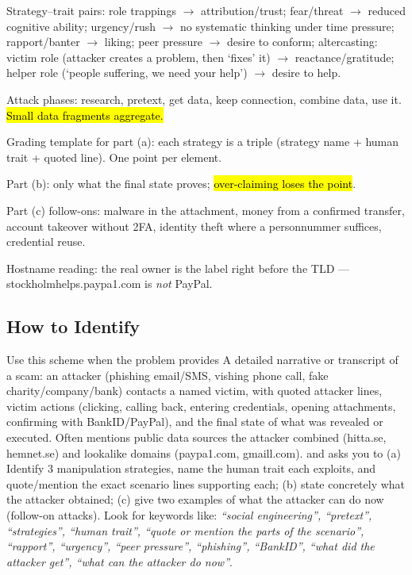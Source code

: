 \documentclass[12pt, a4paper]{article}
\newcommand{\imp}[1]{\hl{#1}}                       %
\begin{document}
\begin{theorybox}
\begin{tightitem}
    \item Strategy--trait pairs: role trappings $\rightarrow$ attribution/trust; fear/threat $\rightarrow$ reduced cognitive ability; urgency/rush $\rightarrow$ no systematic thinking under time pressure; rapport/banter $\rightarrow$ liking; peer pressure $\rightarrow$ desire to conform; altercasting: victim role (attacker creates a problem, then `fixes' it) $\rightarrow$ reactance/gratitude; helper role (`people suffering, we need your help') $\rightarrow$ desire to help.
    \item Attack phases: research, pretext, get data, keep connection, combine data, use it. \imp{Small data fragments aggregate.}
    \item Grading template for part (a): each strategy is a triple (strategy name + human trait + quoted line). One point per element.
    \item Part (b): only what the final state proves; \imp{over-claiming loses the point}.
    \item Part (c) follow-ons: malware in the attachment, money from a confirmed transfer, account takeover without 2FA, identity theft where a personnummer suffices, credential reuse.
    \item Hostname reading: the real owner is the label right before the TLD --- stockholmhelps.paypa1.com is \emph{not} PayPal.
\end{tightitem}
\end{theorybox}

\subsection*{How to Identify}
Use this scheme when the problem provides A detailed narrative or transcript of a scam: an attacker (phishing email/SMS, vishing phone call, fake charity/company/bank) contacts a named victim, with quoted attacker lines, victim actions (clicking, calling back, entering credentials, opening attachments, confirming with BankID/PayPal), and the final state of what was revealed or executed. Often mentions public data sources the attacker combined (hitta.se, hemnet.se) and lookalike domains (paypa1.com, gmaill.com). and asks you to (a) Identify 3 manipulation strategies, name the human trait each exploits, and quote/mention the exact scenario lines supporting each; (b) state concretely what the attacker obtained; (c) give two examples of what the attacker can do now (follow-on attacks). Look for keywords like: \textit{``social engineering'', ``pretext'', ``strategies'', ``human trait'', ``quote or mention the parts of the scenario'', ``rapport'', ``urgency'', ``peer pressure'', ``phishing'', ``BankID'', ``what did the attacker get'', ``what can the attacker do now''}.
\end{document}
